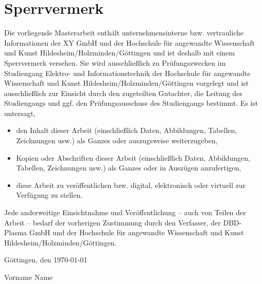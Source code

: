 

\thispagestyle{empty}
\section*{Sperrvermerk}

\vspace*{2em}

Die vorliegende Masterarbeit enthält unternehmensinterne bzw. vertrauliche Informationen der XY GmbH und der Hochschule für angewandte Wissenschaft und Kunst Hildesheim/Holzminden/Göttingen und ist deshalb mit einem Sperrvermerk versehen. Sie wird ausschließlich zu Prüfungszwecken im Studiengang Elektro- und Informationstechnik der Hochschule für angewandte Wissenschaft und Kunst Hildesheim/Holzminden/Göttingen vorgelegt und ist ausschließlich zur Einsicht durch den zugeteilten Gutachter, die Leitung des Studiengangs und ggf. den Prüfungsausschuss des Studiengangs bestimmt.  Es ist untersagt,
\begin{itemize}
	\item den Inhalt dieser Arbeit (einschließlich Daten, Abbildungen, Tabellen, Zeichnungen usw.) als Ganzes oder auszugsweise weiterzugeben,
	\item Kopien oder Abschriften dieser Arbeit (einschließlich Daten, Abbildungen, Tabellen, Zeichnungen usw.) als Ganzes oder in Auszügen anzufertigen,
	\item diese Arbeit zu veröffentlichen bzw. digital, elektronisch oder virtuell zur Verfügung zu stellen. 
\end{itemize}
Jede anderweitige Einsichtnahme und Veröffentlichung – auch von Teilen der Arbeit – bedarf der vorherigen Zustimmung durch den Verfasser, der DBD-Plasma GmbH und der Hochschule für angewandte Wissenschaft und Kunst Hildesheim/Holzminden/Göttingen.

\vspace{3em}

Göttingen, den \today

\vspace{4em}
Vorname Name
